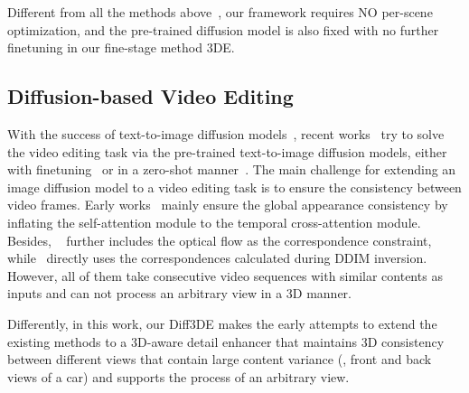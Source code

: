 Different from all the methods above~\cite{deng2023nerdi,xu2022neurallift,Jain_2021_ICCV_dietnerf,Xu_2022_SinNeRF,liu2023zero123,tang2023makeit3d}, our framework requires NO per-scene optimization, and the pre-trained diffusion model is also fixed with no further finetuning in our fine-stage method 3DE. 


\subsection{\textbf{Diffusion-based Video Editing}}

With the success of text-to-image diffusion models~\cite{rombach2022LatentDiff,zhang2023addingControlNet}, recent works~\cite{wu2023tune-a-video,text2video-zero,ceylan2023pix2video,qi2023fatezero,geyer2023tokenflow,yang2023rerender} try to solve the video editing task via the pre-trained text-to-image diffusion models, either with finetuning~\cite{wu2023tune-a-video} or in a zero-shot manner~\cite{text2video-zero,qi2023fatezero,ceylan2023pix2video,geyer2023tokenflow,yang2023rerender}. The main challenge for extending an image diffusion model to a video editing task is to ensure the consistency between video frames. Early works~\cite{wu2023tune-a-video,text2video-zero,ceylan2023pix2video} mainly ensure the global appearance consistency by inflating the self-attention module to the temporal cross-attention module. Besides, ~\cite{yang2023rerender} further includes the optical flow as the correspondence constraint, while~\cite{geyer2023tokenflow} directly uses the correspondences calculated during DDIM inversion. However, all of them take consecutive video sequences with similar contents as inputs and can not process an arbitrary view in a 3D manner. 

Differently, in this work, our Diff3DE makes the early attempts to extend the existing methods to a 3D-aware detail enhancer that maintains 3D consistency between different views that contain large content variance (\eg, front and back views of a car) and supports the process of an arbitrary view. 